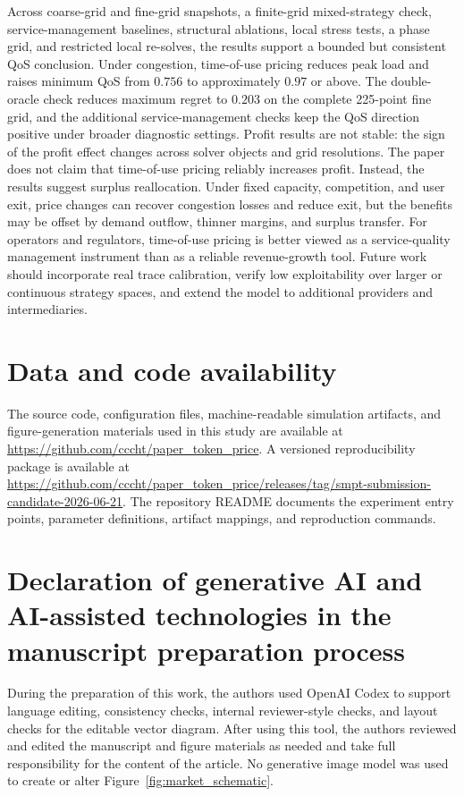 \documentclass[11pt,a4paper]{article}
\begin{document}
Across coarse-grid and fine-grid snapshots, a finite-grid mixed-strategy check, service-management baselines, structural ablations, local stress tests, a phase grid, and restricted local re-solves, the results support a bounded but consistent QoS conclusion. Under congestion, time-of-use pricing reduces peak load and raises minimum QoS from $0.756$ to approximately $0.97$ or above. The double-oracle check reduces maximum regret to $0.203$ on the complete 225-point fine grid, and the additional service-management checks keep the QoS direction positive under broader diagnostic settings. Profit results are not stable: the sign of the profit effect changes across solver objects and grid resolutions. The paper does not claim that time-of-use pricing reliably increases profit. Instead, the results suggest surplus reallocation. Under fixed capacity, competition, and user exit, price changes can recover congestion losses and reduce exit, but the benefits may be offset by demand outflow, thinner margins, and surplus transfer. For operators and regulators, time-of-use pricing is better viewed as a service-quality management instrument than as a reliable revenue-growth tool. Future work should incorporate real trace calibration, verify low exploitability over larger or continuous strategy spaces, and extend the model to additional providers and intermediaries.

\section*{Data and code availability}

The source code, configuration files, machine-readable simulation artifacts, and figure-generation materials used in this study are available at \url{https://github.com/cccht/paper_token_price}. A versioned reproducibility package is available at \url{https://github.com/cccht/paper_token_price/releases/tag/smpt-submission-candidate-2026-06-21}. The repository README documents the experiment entry points, parameter definitions, artifact mappings, and reproduction commands.

\section*{Declaration of generative AI and AI-assisted technologies in the manuscript preparation process}

During the preparation of this work, the authors used OpenAI Codex to support language editing, consistency checks, internal reviewer-style checks, and layout checks for the editable vector diagram. After using this tool, the authors reviewed and edited the manuscript and figure materials as needed and take full responsibility for the content of the article. No generative image model was used to create or alter Figure~\ref{fig:market_schematic}.



\end{document}
